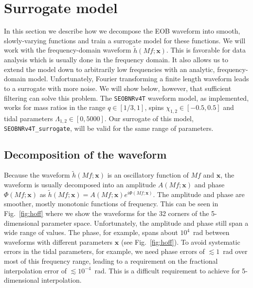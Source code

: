 \documentclass[prd,aps,letter,twocolumn,floatfix,notitlepage,nofootinbib]{revtex4-1}
\def\bx{\mathbf{x}}
\begin{document}
\section{Surrogate model}
\label{sec:surrogate}

In this section we describe how we decompose the EOB waveform into smooth, slowly-varying functions and train a surrogate model for these functions. We will work with the frequency-domain waveform $\tilde h(Mf; \bx)$. This is favorable for data analysis which is usually done in the frequency domain. It also allows us to extend the model down to arbitrarily low frequencies with an analytic, frequency-domain model. Unfortunately, Fourier transforming a finite length waveform leads to a surrogate with more noise. We will show below, however, that sufficient filtering can solve this problem. The \texttt{SEOBNRv4T} waveform model, as implemented, works for mass ratios in the range $q \in [1/3, 1]$, spins $\chi_{1,2} \in [-0.5, 0.5]$ and tidal parameters $\Lambda_{1,2} \in [0, 5000]$. Our surrogate of this model, \texttt{SEOBNRv4T\_surrogate}, will be valid for the same range of parameters.


\subsection{Decomposition of the waveform}

Because the waveform $\tilde h(Mf; \bx)$ is an oscillatory function of $Mf$ and $\bx$, the waveform is usually decomposed into an amplitude $A(Mf; \bx)$ and phase $\Phi(Mf; \bx)$ as $\tilde h(Mf; \bx) = A(Mf; \bx) e^{i\Phi(Mf; \bx)}$. The amplitude and phase are smoother, mostly monotonic functions of frequency. 
This can be seen in Fig.~\ref{fig:hoff} where we show the waveforms for the 32 corners of the 5-dimensional parameter space. Unfortunately, the amplitude and phase still span a wide range of values. The phase, for example, spans about $10^4$~rad between waveforms with different parameters $\bx$ (see Fig.~\ref{fig:hoff}). To avoid systematic errors in the tidal parameters, for example, we need phase errors of $\lesssim 1$~rad over most of this frequency range, leading to a requirement on the fractional interpolation error of $\lesssim 10^{-4}$~rad. This is a difficult requirement to achieve for 5-dimensional interpolation. 
\end{document}
